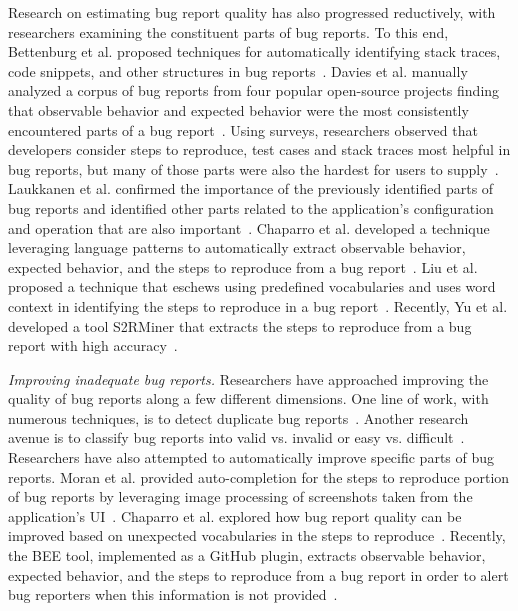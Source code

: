 Research on estimating bug report quality has also progressed reductively, with researchers examining the constituent parts of bug reports. To this end, Bettenburg et al. proposed techniques for automatically identifying stack traces, code snippets, and other structures in bug reports~\cite{bettenburg08extracting}. Davies et al. manually analyzed a corpus of bug reports from four popular open-source projects finding that observable behavior and expected behavior were the most consistently encountered parts of a bug report~\cite{davies14whats}. Using surveys, researchers observed that developers consider steps to reproduce, test cases and stack traces most helpful in bug reports, but many of those parts were also the hardest for users to supply~\cite{sasso2016satisficing}. Laukkanen et al.
confirmed the importance of the previously identified parts of bug reports and identified other parts related to the application's configuration and operation that are also important~\cite{laukkanen2011survey}. Chaparro et al. developed a technique leveraging language patterns to automatically extract observable behavior, expected behavior, and the steps to reproduce from a bug report~\cite{chaparro17detecting}. Liu et al. proposed a technique that eschews using predefined vocabularies and uses word context in identifying the steps to reproduce in a bug report~\cite{liu2020automated}. Recently, Yu et al. developed a tool S2RMiner that extracts the steps to reproduce from a bug report with high accuracy~\cite{yu2019s2rminer}.

\noindent
{\em Improving inadequate bug reports.} Researchers have approached improving the quality of bug reports along a few different dimensions. One line of work, with numerous techniques, is to detect duplicate bug reports~\cite{sun2011towards,nguyen2012duplicate,chaparro19reformulating}. Another research avenue is to classify bug reports into valid vs. invalid or easy vs. difficult~\cite{fan20chaff,zhou2016combining,hooimeijer07modeling}. Researchers have also attempted to automatically improve specific parts of bug reports. Moran et al. provided auto-completion for the steps to reproduce portion of bug reports by leveraging image processing of screenshots taken from the application's UI~\cite{moran15autocompleting}.  Chaparro et al. explored how bug report quality can be improved based on unexpected vocabularies in the steps to reproduce~\cite{Chaparro2019AssessingTQ}. Recently, the BEE tool, implemented as a GitHub plugin, extracts observable behavior, expected behavior, and the steps to reproduce from a bug report in order to alert bug reporters when this information is not provided~\cite{song2020bee}.

